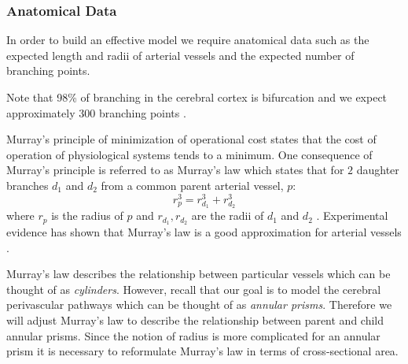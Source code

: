 \documentclass[12pt]{article} %
\theoremstyle{definition}
\begin{document}
  



%
\subsubsection{Anatomical Data}\label{sec:ana}


 
In order to build an effective model we require anatomical data such as the expected length
 and radii of arterial vessels and the expected number of branching points.     

Note that 98\% of branching in the cerebral cortex is bifurcation and we expect approximately 
300 branching points \cite{Cassot}. 

Murray's principle of minimization of operational cost states that the cost of operation of
 physiological systems tends to a minimum.  One consequence of Murray’s principle is referred 
to as Murray's law which states that for $2$ daughter branches $d_{1}$ and $d_{2}$ from a 
common parent arterial vessel, $p$: 
\[r_{p}^{3} = r_{d_{1}}^{3} + r_{d_{2}}^{3}\]
where $r_{p}$ is the radius of $p$ and $r_{d_{1}},r_{d_{2}}$ are the radii of $d_{1}$ and 
$d_{2}$ \cite{Murray}.
Experimental evidence has shown that Murray's law is a good approximation for 
arterial vessels \cite{Cohn,Zamir}.

Murray's law describes the relationship between particular vessels which can be thought of as 
\emph{cylinders}.  However, recall that our goal is to model the cerebral perivascular pathways
which can be thought of as \emph{annular prisms}.  Therefore we will adjust Murray's law to describe 
the relationship between parent and child annular prisms.  Since the notion of radius is more 
complicated for an annular prism it is necessary to reformulate Murray's law in terms of 
cross-sectional area.   
\end{document}
